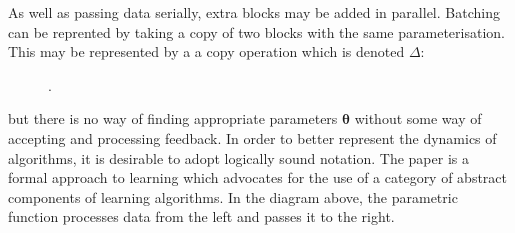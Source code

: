 \documentclass[10pt,a4paper]{article}
\begin{document}
As well as passing data serially, extra blocks may be added in parallel.
Batching can be reprented by taking a copy of two blocks with the same parameterisation.
This may be represented by a a copy operation which is denoted $\Delta$:
\begin{figure}[H]
\centering
{}.
\end{figure}

but there is no way of finding appropriate parameters $\boldsymbol\theta$ without some way of accepting and processing feedback.
In order to better represent the dynamics of algorithms, it is desirable to adopt logically sound notation.
The paper \cite{cruttwell2024deeplearningparametriclenses} is a formal approach to learning which advocates for the use of a category of abstract components of learning algorithms.
In the diagram above, the parametric function processes data from the left and passes it to the right.
\end{document}
